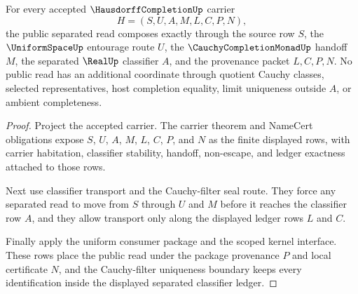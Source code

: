 \begin{theorem}
\label{thm:hausdorff-completion-public-route-composition}
For every accepted $\HausdorffCompletionUp$ carrier
$$
H=(S,U,A,M,L,C,P,N),
$$
the public separated read composes exactly through the source row $S$, the $\UniformSpaceUp$ entourage route $U$, the $\CauchyCompletionMonadUp$ handoff $M$, the separated $\RealUp$ classifier $A$, and the provenance packet $L,C,P,N$. No public read has an additional coordinate through quotient Cauchy classes, selected representatives, host completion equality, limit uniqueness outside $A$, or ambient completeness.
\end{theorem}
\begin{proof}
Project the accepted carrier. The carrier theorem and NameCert obligations expose $S$, $U$, $A$, $M$, $L$, $C$, $P$, and $N$ as the finite displayed rows, with carrier habitation, classifier stability, handoff, non-escape, and ledger exactness attached to those rows.

Next use classifier transport and the Cauchy-filter seal route. They force any separated read to move from $S$ through $U$ and $M$ before it reaches the classifier row $A$, and they allow transport only along the displayed ledger rows $L$ and $C$.

Finally apply the uniform consumer package and the scoped kernel interface. These rows place the public read under the package provenance $P$ and local certificate $N$, and the Cauchy-filter uniqueness boundary keeps every identification inside the displayed separated classifier ledger.
\end{proof}

